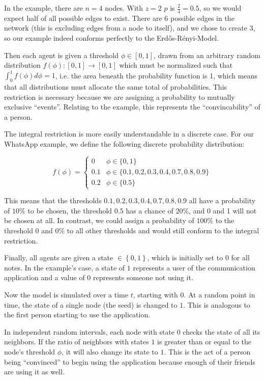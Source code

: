 \documentclass{sig-alternate-05-2015}
\begin{document}
In the example, there are $n = 4$ nodes. With $z = 2$ $p$ is $\frac{2}{4} = 0.5$, so we would expect half of all possible edges to exist. There are 6 possible edges in the network (this is excluding edges from a node to itself), and we chose to create 3, so our example indeed conforms perfectly to the Erdős-Rényi-Model.

Then each agent is given a threshold $\phi \in [0,1]$, drawn from an arbitrary random distribution $f(\phi): [0,1] \rightarrow [0,1]$ which must be normalized such that $\int_0^1 f(\phi) d\phi = 1$, i.e. the area beneath the probability function is 1, which means that all distributions must allocate the same total of probabilities. This restriction is necessary because we are assigning a probability to mutually exclusive ``events''. Relating to the example, this represents the ``convincability'' of a person.

The integral restriction is more easily understandable in a discrete case. For our WhatsApp example, we define the following discrete probability distribution:

$$
f(\phi) =
  \begin{cases}
    0 & \phi \in \{0, 1\} \\
    0.1 & \phi \in \{0.1, 0.2, 0.3, 0.4, 0.7, 0.8, 0.9\} \\
    0.2 & \phi \in \{0.5\}
  \end{cases}
$$

This means that the thresholds $0.1, 0.2, 0.3, 0.4, 0.7, 0.8, 0.9$ all have a probability of $10\%$ to be chosen, the threshold $0.5$ has a chance of $20\%$, and 0 and 1 will not be chosen at all. In contrast, we could assign a probability of $100\%$ to the threshold 0 and $0\%$ to all other thresholds and would still conform to the integral restriction.

Finally, all agents are given a state $\in \left\lbrace 0, 1 \right\rbrace$, which is initially set to $0$ for all notes. In the example's case, a state of $1$ represents a user of the communication application and a value of $0$ represents someone not using it.

Now the model is simulated over a time $t$, starting with $0$. At a random point in time, the state of a single node (the seed) is changed to $1$. This is analogous to the first person starting to use the application.

In independent random intervals, each node with state $0$ checks the state of all its neighbors. If the ratio of neighbors with states $1$ is greater than or equal to the node's threshold $\phi$, it will also change its state to $1$. This is the act of a person being ``convinced'' to begin using the application because enough of their friends are using it as well.
\end{document}
